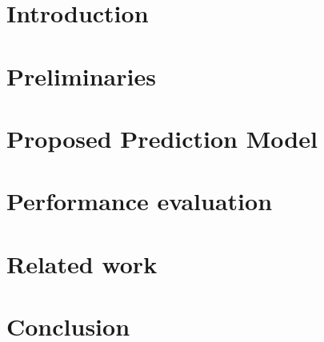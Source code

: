 \documentclass[conference]{IEEEtran}
\begin{document}
\section{Introduction}
\label{sec:introduction}

\section{Preliminaries}
\label{sec:preliminaries}

\section{Proposed Prediction Model}
\label{sec:proposed_prediction_model}

\section{Performance evaluation}
\label{sec:performance_evaluation}

\section{Related work}
\label{sec:related_work}

\section{Conclusion}
\label{sec:conclusion}

\newcommand{\BIBdecl}{\setlength{\itemsep}{0.25 em}}


% 
\IEEEpeerreviewmaketitle
\end{document}
